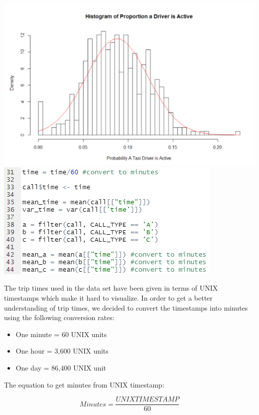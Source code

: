 \documentclass[11pt]{article}
\begin{document}
\noindent\includegraphics{Hist(PropActDriv).png}\\

\centering\noindent\includegraphics{Part3(Code).png}\\

\flushleft\par
The trip times used in the data set have been given in terms of UNIX timestamps which make it hard to visualize. In order to get a better understanding of trip times, we decided to convert the timestamps into minutes using the following conversion rates:

\begin{itemize}
	\item One minute = 60 UNIX units
	\item One hour = 3,600 UNIX units
	\item One day = 86,400 UNIX unit
\end{itemize}

\par
The equation to get minutes from UNIX timestamp:

\begin{equation}
Minutes = \frac{UNIX TIMESTAMP}{60}
\end{equation}
\end{document}
